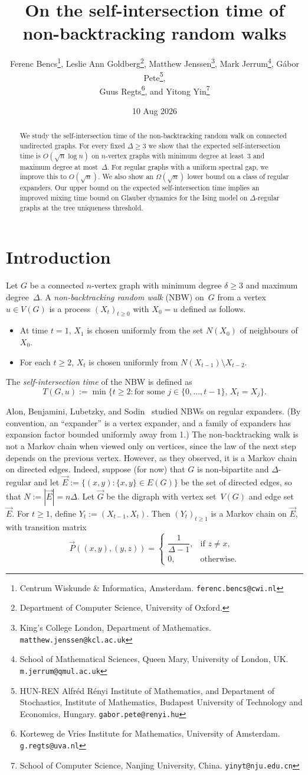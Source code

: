\documentclass[11pt,a4paper]{article}
\title{On the self-intersection time of non-backtracking random walks}
\author{Ferenc Bencs\thanks{Centrum Wiskunde \& Informatica, Amsterdam. \texttt{ferenc.bencs@cwi.nl}}, Leslie Ann Goldberg\thanks{Department of Computer Science, University of Oxford.}, Matthew Jenssen\thanks{King's College London, Department of Mathematics. \texttt{matthew.jenssen@kcl.ac.uk} }, Mark Jerrum\thanks{School of Mathematical Sciences, Queen Mary, University of London, UK\@. \texttt{m.jerrum@qmul.ac.uk}},  G\'abor Pete\thanks{HUN-REN Alfréd Rényi Institute of Mathematics, and Department of Stochastics, Institute of Mathematics, Budapest University of Technology and Economics, Hungary. \texttt{gabor.pete@renyi.hu}},\\ Guus Regts\thanks{Korteweg de Vries Institute for Mathematics, University of Amsterdam. \texttt{g.regts@uva.nl}}, and Yitong Yin\thanks{School of Computer Science, Nanjing University, China. \texttt{yinyt@nju.edu.cn}}}
\date{10 Aug 2026}
\theoremstyle{plain}
\def\Evec{\vec E}
\def\vecE{\Evec}
\def\Gvec{\vec G}
\begin{document}
\maketitle


\begin{abstract}
We study the self-intersection time of the non-backtracking random walk on connected undirected graphs. For every fixed $\Delta \geq 3$ we show that the expected self-intersection time is $O(\sqrt{n} \log n)$ on $n$-vertex graphs with minimum degree at least~$3$ and maximum degree at most~$\Delta$. For regular graphs with a uniform spectral gap, we improve this to $O(\sqrt{n})$. We also show an $\Omega(\sqrt{n})$ lower bound on a class of regular expanders. Our upper bound on the expected self-intersection time implies an improved mixing time bound on Glauber dynamics for the Ising model on $\Delta$-regular graphs at the tree uniqueness threshold.
\end{abstract}

\section{Introduction}

Let $G$ be a connected $n$-vertex graph with minimum degree $\delta\ge 3$ and maximum degree~$\Delta$.
A \emph{non-backtracking random walk} (NBW) on~$G$ 
from a vertex $u\in V(G)$ 
is a process $(X_t)_{t\geq 0}$ with $X_0=u$ defined as follows.
\begin{itemize}
\item At time $t=1$, $X_1$ is chosen uniformly from the set $N(X_0)$ of neighbours of~$X_0$.
\item For each $t\geq 2$, $X_t$ is chosen uniformly from $N(X_{t-1}) \setminus X_{t-2}$.
\end{itemize}
The \emph{self-intersection time} of the NBW is defined 
as \[T(G,u):= \min \{ t\geq 2 \colon 
\mbox{for some $j\in \{0,\ldots,t-1\}$, } 
X_t = X_j \}.\]

Alon, Benjamini, Lubetzky, and Sodin~\cite{ABLS} studied NBWs on regular expanders. (By convention, an ``expander'' is a vertex expander, and a family of expanders has expansion factor bounded uniformly away from 1.) 
The non-backtracking walk is not a Markov chain when viewed only on vertices, since the law of the next step depends on the previous vertex. However, as they observed, it is a Markov chain on directed edges. 
Indeed, suppose (for now) that $G$ is non-bipartite and $\Delta$-regular and let
$
\vec E:=\{(x,y):\{x,y\}\in E(G)\}
$
be the set of directed edges, so that
\(
N:=|\vec E|=n\Delta.
\) Let $\Gvec$ be the digraph with vertex set~$V(G)$ and edge set~$\vecE$.
For \(t\ge 1\), define
$
Y_t:=(X_{t-1},X_t)$.
Then \((Y_t)_{t\ge 1}\) is a Markov chain on \(\vec E\), with transition
matrix
\[
\vec P((x,y),(y,z))
=
\begin{cases}
\dfrac1{\Delta-1}, & \text{if }  z\neq x,\\[4pt]
0, & \text{otherwise}.
\end{cases}
\]
\end{document}
